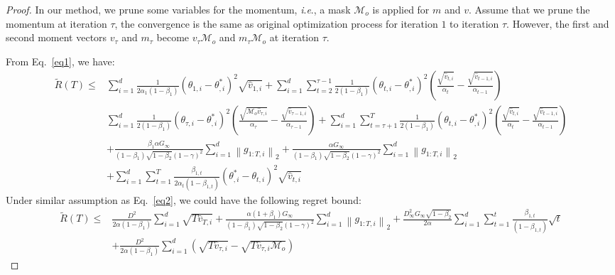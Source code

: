 \documentclass{article}
\theoremstyle{plain}
\theoremstyle{definition}
\theoremstyle{remark}
\newcommand{\ie}{\textit{i}.\textit{e}.}
\begin{document}
\begin{CJK}{UTF8}{gbsn}
\begin{proof}
In our method, we prune some variables for the momentum, \ie, a mask $\mathcal{M}_o$ is applied for $m$ and $v$. Assume that we prune the momentum at iteration $\tau$, the convergence is the same as original optimization process for iteration $1$ to iteration $\tau$. However, the first and second moment vectors $v_{\tau}$ and $m_{\tau}$ become $v_{\tau}\mathcal{M}_o$ and $m_{\tau}\mathcal{M}_o$ at iteration $\tau$.

From Eq.~\ref{eq1}, we have:
\begin{equation}
	\begin{aligned}
		\tilde R(T) \leq & \sum_{i=1}^d \frac{1}{2 \alpha_1\left(1-\beta_1\right)}\left(\theta_{1, i}-\theta_{, i}^*\right)^2 \sqrt{\widehat{v}_{1, i}}+\sum_{i=1}^d \sum_{t=2}^{\tau-1} \frac{1}{2\left(1-\beta_1\right)}\left(\theta_{t, i}-\theta_{, i}^*\right)^2\left(\frac{\sqrt{\widehat{v}_{t, i}}}{\alpha_t}-\frac{\sqrt{\widehat{v}_{t-1, i}}}{\alpha_{t-1}}\right) \\
		&\sum_{i=1}^d \frac{1}{2\left(1-\beta_1\right)}\left(\theta_{\tau, i}-\theta_{, i}^*\right)^2\left(\frac{\sqrt{\mathcal{M}_o\widehat{v}_{\tau, i}}}{\alpha_\tau}-\frac{\sqrt{\widehat{v}_{\tau-1, i}}}{\alpha_{\tau-1}}\right)+\sum_{i=1}^d \sum_{t={\tau+1}}^{T} \frac{1}{2\left(1-\beta_1\right)}\left(\theta_{t, i}-\theta_{, i}^*\right)^2\left(\frac{\sqrt{\widehat{v}_{t, i}}}{\alpha_t}-\frac{\sqrt{\widehat{v}_{t-1, i}}}{\alpha_{t-1}}\right) \\
		& +\frac{\beta_1 \alpha G_{\infty}}{\left(1-\beta_1\right) \sqrt{1-\beta_2}(1-\gamma)^2} \sum_{i=1}^d\left\|g_{1: T, i}\right\|_2+\frac{\alpha G_{\infty}}{\left(1-\beta_1\right) \sqrt{1-\beta_2}(1-\gamma)^2} \sum_{i=1}^d\left\|g_{1: T, i}\right\|_2 \\
		& +\sum_{i=1}^d \sum_{t=1}^T \frac{\beta_{1, t}}{2 \alpha_t\left(1-\beta_{1, t}\right)}\left(\theta_{, i}^*-\theta_{t, i}\right)^2 \sqrt{\widehat{v}_{t, i}}
	\end{aligned}
\end{equation}
Under similar assumption as Eq.~\ref{eq2}, we could have the following regret bound:
\begin{equation}
	\begin{aligned}\label{eq2}
		\tilde R(T) 
		\leq & \frac{D^2}{2 \alpha\left(1-\beta_1\right)} \sum_{i=1}^d \sqrt{T \widehat{v}_{T, i}}+\frac{\alpha\left(1+\beta_1\right) G_{\infty}}{\left(1-\beta_1\right) \sqrt{1-\beta_2}(1-\gamma)^2} \sum_{i=1}^d\left\|g_{1: T, i}\right\|_2 
		+\frac{D_{\infty}^2 G_{\infty} \sqrt{1-\beta_2}}{2 \alpha} \sum_{i=1}^d \sum_{t=1}^t \frac{\beta_{1, t}}{\left(1-\beta_{1, t}\right)} \sqrt{t}\\
		& +\frac{D^2}{2 \alpha\left(1-\beta_1\right)} \sum_{i=1}^d (\sqrt{T \widehat{v}_{\tau, i}} - \sqrt{T \widehat{v}_{\tau, i}\mathcal{M}_o})
	\end{aligned}
\end{equation}
\end{proof}



\end{CJK}
\end{document}

